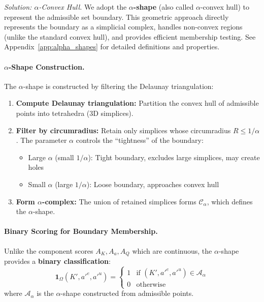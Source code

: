 \textit{Solution: $\alpha$-Convex Hull.}
We adopt the \textbf{$\alpha$-shape} (also called $\alpha$-convex hull) to represent the admissible set boundary. This geometric approach directly represents the boundary as a simplicial complex, handles non-convex regions (unlike the standard convex hull), and provides efficient membership testing. See Appendix~\ref{app:alpha_shapes} for detailed definitions and properties.


\paragraph{$\alpha$-Shape Construction.}
The $\alpha$-shape is constructed by filtering the Delaunay triangulation:
\begin{enumerate}
    \item \textbf{Compute Delaunay triangulation:} Partition the convex hull of admissible points into tetrahedra (3D simplices).
    \item \textbf{Filter by circumradius:} Retain only simplices whose circumradius $R \leq 1/\alpha$. The parameter $\alpha$ controls the ``tightness'' of the boundary:
    \begin{itemize}
        \item Large $\alpha$ (small $1/\alpha$): Tight boundary, excludes large simplices, may create holes
        \item Small $\alpha$ (large $1/\alpha$): Loose boundary, approaches convex hull
    \end{itemize}
    \item \textbf{Form $\alpha$-complex:} The union of retained simplices forms $\mathcal{C}_\alpha$, which defines the $\alpha$-shape.
\end{enumerate}

\paragraph{Binary Scoring for Boundary Membership.}
Unlike the component scores $A_K, A_a, A_Q$ which are continuous, the $\alpha$-shape provides a \textbf{binary classification}:
\begin{equation}
    \mathbf{1}_{\Omega}(K', a'^e, a'^u) = \begin{cases}
        1 & \text{if } (K', a'^e, a'^u) \in \mathcal{A}_\alpha \\
        0 & \text{otherwise}
    \end{cases}
\end{equation}
where $\mathcal{A}_\alpha$ is the $\alpha$-shape constructed from admissible points.

